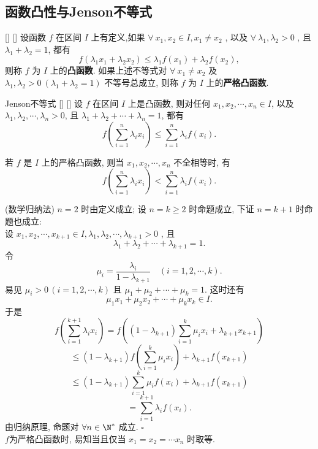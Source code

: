 \documentclass[UTF8]{ctexart}
\begin{document}
		\subsection{函数凸性与Jenson不等式}
			\begin{dfn}
			    []
			    {}
			    []
			    []
				设函数 \(f\) 在区间 \(I\) 上有定义,如果 \(\forall \ x_1, x_2 \in I, x_1 \neq x_2\) , 以及 \( \forall \ \lambda_1, \lambda_2 > 0\) , 且 \(\lambda_1 + \lambda_2 = 1\), 都有
				\[
				f(\lambda_1 x_1 + \lambda_2 x_2) \leq \lambda_1 f(x_1) + \lambda_2 f(x_2),
				\]
				则称 \(f\) 为 \(I\) 上的\textbf{凸函数}. 如果上述不等式对 \(\forall \  x_1 \neq x_2\) 及 \(\lambda_1, \lambda_2 > 0 \ (\lambda_1 + \lambda_2 = 1)\) 不等号总成立, 则称 \(f\) 为 \(I\) 上的\textbf{严格凸函数}.					
			\end{dfn}
			
			\begin{thm}
			    []
			    {Jenson不等式}
			    []
			    []
				设 \(f\) 在区间 \(I\) 上是凸函数, 则对任何 \(x_1, x_2, \cdots, x_n \in I\), 以及 \(\lambda_1, \lambda_2, \cdots, \lambda_n > 0\), 且 \(\lambda_1 + \lambda_2 + \cdots + \lambda_n = 1\), 都有
				\[f\left(\sum_{i=1}^n \lambda_i x_i\right) \leq \sum_{i=1}^n \lambda_i f(x_i). \]

				若 \(f\) 是 \(I\) 上的严格凸函数, 则当 \(x_1, x_2, \cdots, x_n\) 不全相等时, 有
				\[f\left(\sum_{i=1}^n \lambda_i x_i\right) < \sum_{i=1}^n \lambda_i f(x_i). \]
			\end{thm}

			\begin{prf}
				 (数学归纳法)  \(n=2\) 时由定义成立; 设 \(n=k \geq 2\) 时命题成立, 下证 \(n = k+1\) 时命题也成立: \\设 \(x_1, x_2, \cdots, x_{k+1} \in I, \lambda_1, \lambda_2, \cdots, \lambda_{k+1} > 0\) , 且
				\[\lambda_1 + \lambda_2 + \cdots + \lambda_{k+1} = 1.\]令
				\[\mu_i = \frac{\lambda_i}{1 - \lambda_{k+1}} \quad (i = 1, 2, \cdots, k).\]
				易见 \(\mu_i > 0 \, (i = 1, 2, \cdots, k)\) 且 \(\mu_1 + \mu_2 + \cdots + \mu_k = 1\). 这时还有
				\[\mu_1 x_1 + \mu_2 x_2 + \cdots + \mu_k x_k \in I.\]
				于是
				\[f\left(\sum_{i=1}^{k+1} \lambda_i x_i\right) = f\left((1 - \lambda_{k+1}) \sum_{i=1}^k \mu_i x_i + \lambda_{k+1} x_{k+1}\right)\]
				\[\leq (1 - \lambda_{k+1}) f\left(\sum_{i=1}^k \mu_i x_i\right) + \lambda_{k+1} f(x_{k+1})\]
				\[\leq (1 - \lambda_{k+1}) \sum_{i=1}^k \mu_i f(x_i) + \lambda_{k+1} f(x_{k+1})\]
				\[= \sum_{i=1}^{k+1} \lambda_i f(x_i).\]
				由归纳原理, 命题对 \(\forall n\in\N^*\) 成立. \(\square\) \\
    		\(f\)为严格凸函数时, 易知当且仅当 \(x_1=x_2=\cdots x_n\) 时取等.
			\end{prf}
\end{document}
